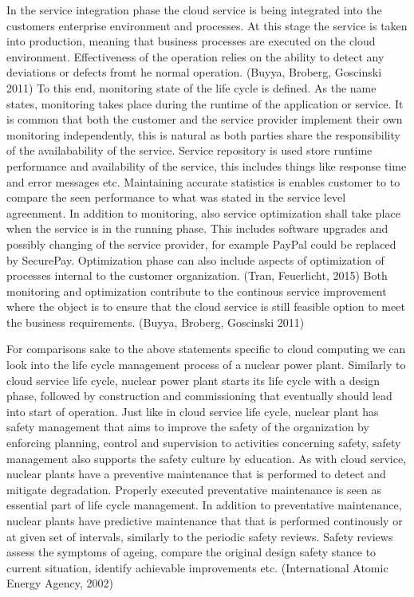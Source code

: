 \documentclass{article}
\begin{document}
In the service integration phase the cloud service is being integrated into the customers enterprise environment and processes. At this stage the service is taken into production, meaning that business processes are executed on the cloud environment. Effectiveness of the operation relies on the ability to detect any deviations or defects fromt he normal operation. (Buyya, Broberg, Goscinski 2011) To this end, monitoring state of the life cycle is defined. As the name states, monitoring takes place during the runtime of the application or service. It is common that both the customer and the service provider implement their own monitoring independently, this is natural as both parties share the responsibility of the availabability of the service. Service repository  is used store runtime performance and availability of the service, this includes things like response time and error messages etc. Maintaining accurate statistics is enables customer to to compare the seen performance to what was stated in the service level agreenment. In addition to monitoring, also service optimization shall take place when the service is in the running phase. This includes software upgrades and possibly changing of the service provider, for example PayPal could be replaced by SecurePay. Optimization phase can also include aspects of optimization of processes internal to the customer organization. (Tran, Feuerlicht, 2015) Both monitoring and optimization contribute to the continous service improvement where the object is to ensure that the cloud service is still feasible option to meet the business requirements. (Buyya, Broberg, Goscinski 2011)
\par
For comparisons sake to the above statements specific to cloud computing we can look into the life cycle management process of a nuclear power plant. Similarly to cloud service life cycle, nuclear power plant starts its life cycle with a design phase, followed by construction and commissioning that eventually should lead into start of operation. Just like in cloud service life cycle, nuclear plant has safety management that aims to improve the safety of the organization by enforcing planning, control and supervision to activities concerning safety, safety management also supports the safety culture by education. As with cloud service, nuclear plants have a preventive maintenance that is performed to detect and mitigate degradation. Properly executed preventative maintenance is seen as essential part of life cycle management. In addition to preventative maintenance, nuclear plants have predictive maintenance that that is performed continously or at given set of intervals, similarly to the periodic safety reviews. Safety reviews assess the symptoms of ageing, compare the original design safety stance to current situation, identify achievable improvements etc. (International Atomic Energy Agency, 2002) 
\end{document}
